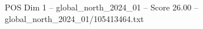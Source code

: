 \begin{textsample}{POS Dim 1 – global\_north\_2024\_01 – Score 26.00 – global\_north\_2024\_01/105413464.txt}
\end{textsample}
